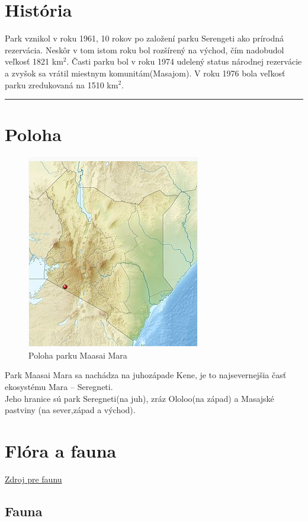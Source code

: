 \documentclass{article}
\begin{document}
\section{História}

Park vznikol v roku 1961, 10 rokov po založení parku Serengeti ako prírodná rezervácia. Neskôr v tom istom roku bol rozšírený na východ, čím nadobudol veľkosť 1821 km$^2$.
Časti parku bol v roku 1974 udelený status národnej rezervácie a zvyšok sa vrátil miestnym komunitám(Masajom). 
V roku 1976 bola veľkosť parku zredukovaná na 1510 km$^2$.
\bigskip
\hrule
\section{Poloha}

\begin{figure}[h]
\includegraphics[scale=0.5]{location.png}\caption{Poloha parku Maasai Mara}
\end{figure} 
\medskip
\noindent  

Park Maasai Mara sa nachádza na juhozápade Kene, je to najsevernejšia časť ekosystému Mara -- Seregneti.\\ Jeho hranice sú park Seregneti(na juh), 
zráz Ololoo(na západ) 
a Masajské pastviny (na sever,západ a východ).
\newpage
\section{Flóra a fauna}


\href{https://www.safaribookings.com/masai-mara/wildlife}{Zdroj pre faunu}

\subsection{Fauna}
\end{document}
